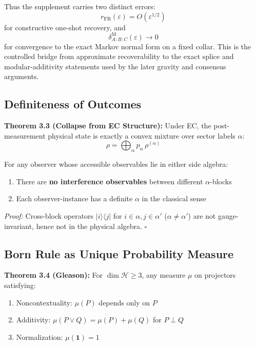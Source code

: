 Thus the supplement carries two distinct errors:
\[
r_{\mathrm{FR}}(\varepsilon)=O(\varepsilon^{1/2})
\]
for constructive one-shot recovery, and
\[
\delta^{\mathrm M}_{A:B:C}(\varepsilon)\to0
\]
for convergence to the exact Markov normal form on a fixed collar. This is the controlled bridge from approximate recoverability to the exact splice and modular-additivity statements used by the later gravity and consensus arguments.

\subsection{Definiteness of Outcomes}\label{34-definiteness-of-outcomes}

\textbf{Theorem 3.3 (Collapse from EC Structure):} Under EC, the post-measurement physical state is exactly a convex mixture over sector labels \(\alpha\): \[\rho = \bigoplus_\alpha p_\alpha \, \rho^{(\alpha)}\]

For any observer whose accessible observables lie in either side algebra:

\begin{enumerate}
\def\labelenumi{\arabic{enumi}.}
\tightlist
\item
 There are \textbf{no interference observables} between different \(\alpha\)-blocks
\item
 Each observer-instance has a definite \(\alpha\) in the classical sense
\end{enumerate}

\emph{Proof:} Cross-block operators \(|i\rangle\langle j|\) for \(i \in \alpha, j \in \alpha'\) (\(\alpha \neq \alpha'\)) are not gauge-invariant, hence not in the physical algebra. \(\square\)

\subsection{Born Rule as Unique Probability Measure}\label{35-born-rule-as-unique-probability-measure}

\textbf{Theorem 3.4 (Gleason):} For \(\dim \mathcal{H} \geq 3\), any measure \(\mu\) on projectors satisfying:

\begin{enumerate}
\def\labelenumi{\arabic{enumi}.}
\tightlist
\item
 Noncontextuality: \(\mu(P)\) depends only on \(P\)
\item
 Additivity: \(\mu(P \vee Q) = \mu(P) + \mu(Q)\) for \(P \perp Q\)
\item
 Normalization: \(\mu(\mathbf{1}) = 1\)
\end{enumerate}

